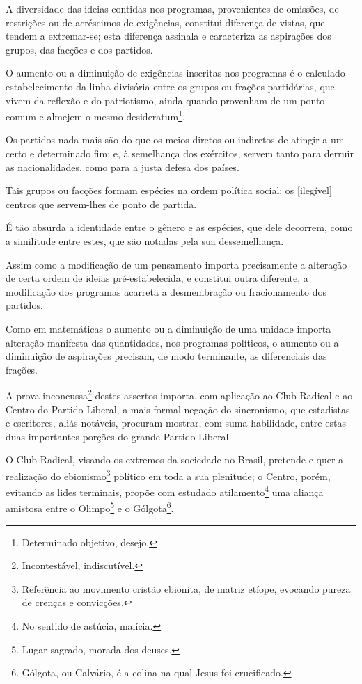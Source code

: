 A diversidade das ideias contidas nos programas, provenientes de
omissões, de restrições ou de acréscimos de exigências, constitui
diferença de vistas, que tendem a extremar-se; esta diferença assinala e
caracteriza as aspirações dos grupos, das facções e dos partidos.

O aumento ou a diminuição de exigências inscritas nos programas é o
calculado estabelecimento da linha divisória entre os grupos ou frações
partidárias, que vivem da reflexão e do patriotismo, ainda quando
provenham de um ponto comum e almejem o mesmo desideratum\footnote{
  Determinado objetivo, desejo.}.

Os partidos nada mais são do que os meios diretos ou indiretos de
atingir a um certo e determinado fim; e, à semelhança dos exércitos,
servem tanto para derruir as nacionalidades, como para a justa defesa
dos países.

Tais grupos ou facções formam espécies na ordem política social; os
{[}ilegível{]} centros que servem-lhes de ponto de partida.

É tão absurda a identidade entre o gênero e as espécies, que dele
decorrem, como a similitude entre estes, que são notadas pela sua
dessemelhança.

Assim como a modificação de um pensamento importa precisamente a
alteração de certa ordem de ideias pré-estabelecida, e constitui outra
diferente, a modificação dos programas acarreta a desmembração ou
fracionamento dos partidos.

Como em matemáticas o aumento ou a diminuição de uma unidade importa
alteração manifesta das quantidades, nos programas políticos, o aumento
ou a diminuição de aspirações precisam, de modo terminante, as
diferenciais das frações.

A prova inconcussa\footnote{Incontestável, indiscutível.} destes
assertos importa, com aplicação ao Club Radical e ao Centro do Partido
Liberal, a mais formal negação do sincronismo, que estadistas e
escritores, aliás notáveis, procuram mostrar, com suma habilidade, entre
estas duas importantes porções do grande Partido Liberal.

O Club Radical, visando os extremos da sociedade no Brasil, pretende e
quer a realização do ebionismo\footnote{Referência ao movimento
  cristão ebionita, de matriz etíope, evocando pureza de crenças e
  convicções.} político em toda a sua plenitude; o Centro, porém,
evitando as lides terminais, propõe com estudado atilamento\footnote{
  No sentido de astúcia, malícia.} uma aliança amistosa entre o
Olimpo\footnote{Lugar sagrado, morada dos deuses.} e o
Gólgota\footnote{Gólgota, ou Calvário, é a colina na qual Jesus foi
  crucificado.}.

